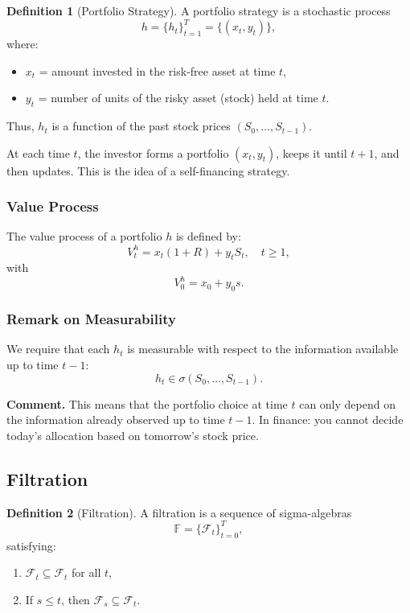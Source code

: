 \documentclass[12pt,a4paper]{article}
\theoremstyle{definition}
\newtheorem{definition}{Definition}[section]
\begin{document}
\begin{definition}[Portfolio Strategy]
A portfolio strategy is a stochastic process
\[
h = \{h_t\}_{t=1}^T = \{(x_t, y_t)\},
\]
where:
\begin{itemize}
\item $x_t$ = amount invested in the risk-free asset at time $t$,
\item $y_t$ = number of units of the risky asset (stock) held at time $t$.
\end{itemize}
\end{definition}

Thus, $h_t$ is a function of the past stock prices $(S_0, \ldots, S_{t-1})$.

At each time $t$, the investor forms a portfolio $(x_t, y_t)$, keeps it until $t+1$, and then updates. This is the idea of a self-financing strategy.

\subsubsection{Value Process}

The value process of a portfolio $h$ is defined by:
\[
V_t^h = x_t(1 + R) + y_t S_t, \quad t \geq 1,
\]
with
\[
V_0^h = x_0 + y_0 s.
\]

\subsubsection{Remark on Measurability}

We require that each $h_t$ is measurable with respect to the information available up to time $t-1$:
\[
h_t \in \sigma(S_0, \ldots, S_{t-1}).
\]

\textbf{Comment.}
This means that the portfolio choice at time $t$ can only depend on the information already observed up to time $t-1$. In finance: you cannot decide today's allocation based on tomorrow's stock price.

\subsection{Filtration}

\begin{definition}[Filtration]
A filtration is a sequence of sigma-algebras
\[
\mathbb{F} = \{\mathcal{F}_t\}_{t=0}^T,
\]
satisfying:
\begin{enumerate}
\item $\mathcal{F}_t \subseteq \mathcal{F}_t$ for all $t$,
\item If $s \leq t$, then $\mathcal{F}_s \subseteq \mathcal{F}_t$.
\end{enumerate}
\end{definition}
\end{document}
